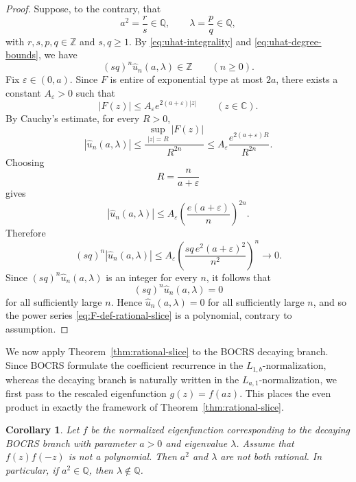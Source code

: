 \documentclass[11pt,letterpaper]{amsart}
\numberwithin{equation}{section}
\theoremstyle{plain}
\newtheorem{corollary}[theorem]{Corollary}
\theoremstyle{remark}
\newcommand{\Z}{\mathbb{Z}}
\newcommand{\Q}{\mathbb{Q}}
\begin{document}
\begin{proof}
Suppose, to the contrary, that
\[
a^2=\frac{r}{s}\in\Q,
\qquad
\lambda=\frac{p}{q}\in\Q,
\]
with $r,s,p,q\in\Z$ and $s,q\ge 1$. By \eqref{eq:uhat-integrality} and \eqref{eq:uhat-degree-bounds}, we have
\[
(sq)^n\widehat u_n(a,\lambda)\in\Z
\qquad(n\ge 0).
\]
Fix $\varepsilon\in(0,a)$. Since $F$ is entire of exponential type at most $2a$, there exists a constant $A_{\varepsilon}>0$ such that
\[
|F(z)|\le A_{\varepsilon}e^{2(a+\varepsilon)|z|}
\qquad(z\in\mathbb C).
\]
By Cauchy's estimate, for every $R>0$,
\[
|\widehat u_n(a,\lambda)|
\le \frac{\sup_{|z|=R}|F(z)|}{R^{2n}}
\le A_{\varepsilon}\frac{e^{2(a+\varepsilon)R}}{R^{2n}}.
\]
Choosing
\[
R=\frac{n}{a+\varepsilon}
\]
gives
\[
|\widehat u_n(a,\lambda)|
\le A_{\varepsilon}\left(\frac{e(a+\varepsilon)}{n}\right)^{2n}.
\]
Therefore
\[
(sq)^n|\widehat u_n(a,\lambda)|
\le A_{\varepsilon}\left(\frac{sq\,e^2(a+\varepsilon)^2}{n^2}\right)^n
\longrightarrow 0.
\]
Since $(sq)^n\widehat u_n(a,\lambda)$ is an integer for every $n$, it follows that
\[
(sq)^n\widehat u_n(a,\lambda)=0
\]
for all sufficiently large $n$. Hence $\widehat u_n(a,\lambda)=0$ for all sufficiently large $n$, and so the power series \eqref{eq:F-def-rational-slice} is a polynomial, contrary to assumption.
\end{proof}

We now apply Theorem~\ref{thm:rational-slice} to the BOCRS decaying branch. Since BOCRS
formulate the coefficient recurrence in the \(L_{1,b}\)-normalization, whereas the decaying
branch is naturally written in the \(L_{a,1}\)-normalization, we first pass to the rescaled
eigenfunction \(g(z)=f(az)\). This places the even product in exactly the framework of
Theorem~\ref{thm:rational-slice}.

\begin{corollary}\label{cor:BOCRS-rational-slice}
Let \(f\) be the normalized eigenfunction corresponding to the decaying BOCRS branch
with parameter \(a>0\) and eigenvalue \(\lambda\). Assume that \(f(z)f(-z)\) is not a
polynomial. Then \(a^2\) and \(\lambda\) are not both rational. In particular, if \(a^2\in\Q\),
then \(\lambda\notin\Q\).
\end{corollary}
\end{document}
